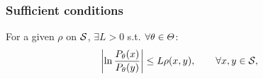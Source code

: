 \begin{frame} 
  \frametitle{Sufficient conditions}
  \begin{assumption}
    For a given $\rho$ on ${\mathcal{S}}$, $\exists L > 0$ s.t. $\forall \theta \in \Theta$:
    \begin{align}
      \left|\ln \frac{P_\theta(x)}{P_\theta(y)}\right|
      &\leq
        L \rho(x, y), \qquad \forall x, y \in \mathcal{{\mathcal{S}}},
        \label{eq:hoelder-observations}
    \end{align}  
    \label{ass:hoelder-observations}
  \end{assumption}
\end{frame}



